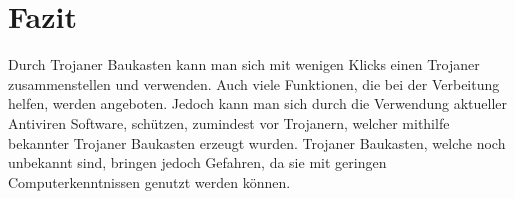 \section{Fazit}\label{sec:fazit}
Durch Trojaner Baukasten kann man sich mit wenigen Klicks einen Trojaner zusammenstellen und verwenden. Auch viele Funktionen, die bei der Verbeitung helfen, werden angeboten. Jedoch kann man sich durch die Verwendung aktueller Antiviren Software, schützen, zumindest vor Trojanern, welcher mithilfe bekannter Trojaner Baukasten erzeugt wurden. Trojaner Baukasten, welche noch unbekannt sind, bringen jedoch Gefahren, da sie mit geringen Computerkenntnissen genutzt werden können.